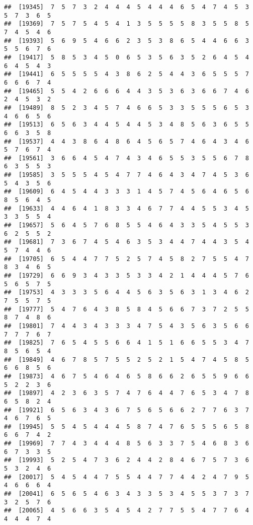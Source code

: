 \documentclass[
]{book}
\begin{document}
\begin{verbatim}
##  [19345]  7  5  7  3  2  4  4  4  5  4  4  4  6  5  4  7  4  5  3  5  7  3  6  5
##  [19369]  7  5  7  5  4  5  4  1  3  5  5  5  5  8  3  5  5  8  5  7  4  5  4  6
##  [19393]  5  6  9  5  4  6  6  2  3  5  3  8  6  5  4  4  6  6  3  5  5  6  7  6
##  [19417]  5  8  5  3  4  5  0  6  5  3  5  6  3  5  2  6  4  5  4  6  4  5  4  3
##  [19441]  6  5  5  5  5  4  3  8  6  2  5  4  4  3  6  5  5  5  7  6  6  6  7  4
##  [19465]  5  5  4  2  6  6  6  4  4  3  5  3  6  3  6  6  7  4  6  2  4  5  3  2
##  [19489]  8  5  2  3  4  5  7  4  6  6  5  3  3  5  5  5  6  5  3  4  6  6  5  6
##  [19513]  6  5  6  3  4  4  5  4  4  5  3  4  8  5  6  3  6  5  5  6  6  3  5  8
##  [19537]  4  4  3  8  6  4  8  6  4  5  6  5  7  4  6  4  3  4  6  5  7  6  7  4
##  [19561]  3  6  6  4  5  4  7  4  3  4  6  5  5  3  5  5  6  7  8  6  3  5  5  3
##  [19585]  3  5  5  5  4  5  4  7  7  4  6  4  3  4  7  4  5  3  6  5  4  3  5  6
##  [19609]  6  4  5  4  4  3  3  3  1  4  5  7  4  5  6  4  6  5  6  8  5  6  4  5
##  [19633]  4  4  6  4  1  8  3  3  4  6  7  7  4  4  5  5  3  4  5  3  3  5  5  4
##  [19657]  5  6  4  5  7  6  8  5  5  4  6  4  3  3  5  4  5  5  3  6  2  5  5  2
##  [19681]  7  3  6  7  4  5  4  6  3  5  3  4  4  7  4  4  3  5  4  5  7  4  4  6
##  [19705]  6  5  4  4  7  7  5  2  5  7  4  5  8  2  7  5  5  4  7  8  3  4  6  5
##  [19729]  6  6  9  3  4  3  3  5  3  3  4  2  1  4  4  4  5  7  6  5  6  5  7  5
##  [19753]  4  3  3  3  5  6  4  4  5  6  3  5  6  3  1  3  4  6  2  7  5  5  7  5
##  [19777]  5  4  7  6  4  3  8  5  8  4  5  6  6  7  3  7  2  5  5  8  7  4  8  6
##  [19801]  7  4  4  3  4  3  3  3  4  7  5  4  3  5  6  3  5  6  6  7  7  7  6  7
##  [19825]  7  6  5  4  5  5  6  6  4  1  5  1  6  6  5  5  3  4  7  8  5  6  5  4
##  [19849]  4  6  7  8  5  7  5  5  2  5  2  1  5  4  7  4  5  8  5  6  6  8  5  6
##  [19873]  4  6  7  5  4  6  4  6  5  8  6  6  2  6  5  5  9  6  6  5  2  2  3  6
##  [19897]  4  2  3  6  3  5  7  4  7  6  4  4  7  6  5  3  4  7  8  6  5  8  2  4
##  [19921]  6  5  6  3  4  3  6  7  5  6  5  6  6  2  7  7  6  3  7  4  6  7  6  5
##  [19945]  5  5  4  5  4  4  4  5  8  7  4  7  6  5  5  5  6  5  8  6  6  7  4  2
##  [19969]  7  7  4  3  4  4  4  8  5  6  3  3  7  5  4  6  8  3  6  6  7  3  3  5
##  [19993]  5  2  5  4  7  3  6  2  4  4  2  8  4  6  7  5  7  3  6  5  3  2  4  6
##  [20017]  5  4  5  4  4  7  5  5  4  4  7  7  4  4  2  4  7  9  5  4  6  6  6  4
##  [20041]  6  5  6  5  4  6  3  4  3  3  5  3  4  5  5  3  7  3  7  3  2  5  7  6
##  [20065]  4  5  6  6  3  5  4  5  4  2  7  7  5  5  4  7  7  6  4  4  4  4  7  4

\end{verbatim}
\end{document}
